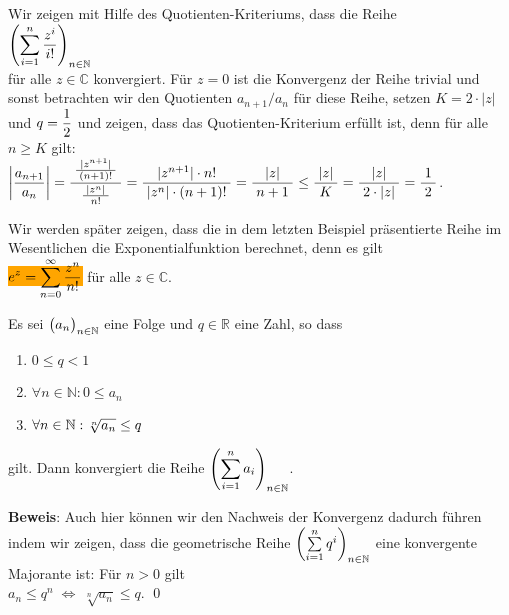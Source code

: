 \example
Wir zeigen mit Hilfe des Quotienten-Kriteriums, dass die Reihe
\\[0.2cm]
\hspace*{1.3cm}
$\displaystyle\left(\sum\limits_{i=1}^n \frac{z^i}{i!}\right)_{n\in\mathbb{N}}$ 
\\[0.2cm]
f\"ur alle $z \in \mathbb{C}$ konvergiert.  F\"ur $z=0$ ist die Konvergenz der
Reihe trivial und sonst betrachten wir
den Quotienten $a_{n+1}/a_n$ f\"ur diese Reihe, setzen $K = 2\cdot |z|$ und $\displaystyle q = \frac{1}{2}$
und zeigen, dass das Quotienten-Kriterium erf\"ullt ist, denn f\"ur alle $n\geq K$ gilt:
\\[0.2cm]
\hspace*{1.3cm}      
$\displaystyle\left|\frac{a_{n+1}}{a_n}\right| =  \frac{\;\frac{|z^{n+1}|}{\;(n+1)!\;}\;}{\frac{\;|z^{n}|\;}{n!}} 
                            =  \frac{\;|z^{n+1}| \cdot  n!\;}{\;|z^{n}| \cdot  (n+1)!\;} 
                            =  \frac{\;|z|\;}{\;n+1\;} 
                            \leq  \frac{\;|z|\;}{\;K\;} 
                            = \frac{\;|z|\;}{\;2\cdot |z|\;} 
                            =  \frac{\;1\;}{\;2\;} 
$.

\remark
Wir werden sp\"ater zeigen, dass die in dem letzten Beispiel pr\"asentierte Reihe im Wesentlichen die
Exponentialfunktion berechnet, denn es gilt  
\\[0.2cm]
\hspace*{1.3cm}
\colorbox{orange}{$\displaystyle e^z = \sum\limits_{n=0}^{\infty} \frac{z^n}{n!}$} \quad f\"ur alle $z \in \mathbb{C}$.
\eox


\begin{Satz}
Es sei $\bigl(a_n\bigr)_{n\in\mathbb{N}}$ eine Folge und $q\in\mathbb{R}$ eine Zahl, so dass 
\begin{enumerate}
\item $0 \leq q < 1$
\item $\forall n \in \mathbb{N}: 0 \leq a_n$
\item $\displaystyle\forall n \in \mathbb{N}: \sqrt[n]{a_n} \leq q$
\end{enumerate}
gilt.  Dann konvergiert die Reihe $\displaystyle\left(\sum\limits_{i=1}^n a_i\right)_{n\in\mathbb{N}}$.
\end{Satz}

\noindent 
\textbf{Beweis}: Auch hier k\"onnen wir den Nachweis der Konvergenz dadurch f\"uhren indem wir
zeigen, dass die geometrische Reihe $\left(\sum\limits_{i=1}^n q^i\right)_{n\in\mathbb{N}}$ eine konvergente Majorante ist: F\"ur
$n>0$ gilt
\\[0.2cm]
\hspace*{1.3cm} $a_n \leq q^n \;\Leftrightarrow\; \sqrt[n]{a_n} \leq q$.
\qed

